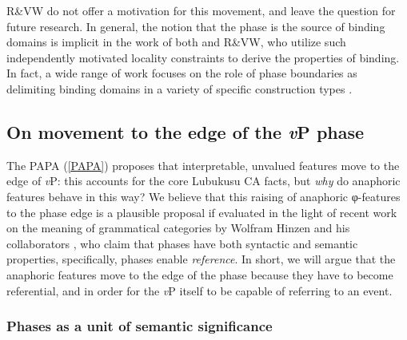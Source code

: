 \documentclass[output=paper
,modfonts
,nonflat
]{langsci/langscibook}
\begin{document}
R\&VW do not offer a motivation for this movement, and leave the question for future research. In general, the notion that the phase is the source of binding domains is implicit in the work of both \citet{Reuland:2011} and R\&VW, who utilize such independently motivated locality constraints to derive the properties of binding. In fact, a wide range of work focuses on the role of phase boundaries as delimiting binding domains in a variety of specific construction types \citep{Wurmbrand:2011,Lee-Schoenfeld:2008,Canac-Marquis:2005,Heinat:2006,Hicks:2009,Quicoli:2008,CharnavelSportiche:2016}.

\subsection{On movement to the edge of the \textit{v}P phase}

The PAPA (\ref{PAPA}) proposes that interpretable, unvalued features move to the edge of \textit{v}P: this accounts for the core Lubukusu CA facts, but \textit{why} do anaphoric features behave in this way? We believe that this raising of anaphoric φ-features to the phase edge is a plausible proposal if evaluated in the light of recent work on the meaning of grammatical categories by Wolfram Hinzen and his collaborators \citep{Hinzen:2012,SheehanHinzen:2011,HinzenSheehan:2013,ArsenijevicHinzen:2012}, who claim that phases have both syntactic and semantic properties, specifically, phases enable \textit{reference}. In short, we will argue that the anaphoric features move to the edge of the phase because they have to become referential, and in order for the \textit{v}P itself to be capable of referring to an event. 

\subsubsection{Phases as a unit of semantic significance}
\end{document}
